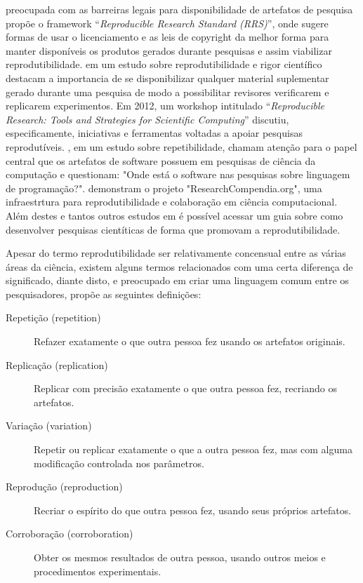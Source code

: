  preocupada com as barreiras legais para
disponibilidade de artefatos de pesquisa propõe o framework ``{\it Reproducible
Research Standard (RRS)}'', onde sugere formas de usar o licenciamento e as leis
de copyright da melhor forma para manter disponíveis os produtos gerados
durante pesquisas e assim viabilizar reprodutibilidade. 
em um estudo sobre reprodutibilidade e rigor científico destacam a importancia
de se disponibilizar qualquer material suplementar gerado durante uma pesquisa
de modo a possibilitar revisores verificarem e replicarem experimentos. Em
2012, um workshop intitulado ``{\it Reproducible Research: Tools and Strategies for
Scientific Computing}'' \cite{Stodden2012} discutiu, especificamente, iniciativas
e ferramentas voltadas a apoiar pesquisas reprodutíveis.
, em um estudo sobre repetibilidade, chamam
atenção para o papel central que os artefatos de software possuem em pesquisas
de ciência da computação e questionam: "Onde está o software nas pesquisas
sobre linguagem de programação?".  demonstram o
projeto "ResearchCompendia.org", uma infraestrtura para reprodutibilidade e
colaboração em ciência computacional. Além destes e tantos outros estudos em
\cite{GithubReproducibilityGuide} é possível acessar um guia sobre como
desenvolver pesquisas cientíticas de forma que promovam a reprodutibilidade.

Apesar do termo reprodutibilidade ser relativamente concensual entre as várias
áreas da ciência, existem alguns termos relacionados com uma certa diferença
de significado, diante disto, e preocupado em criar uma linguagem comum entre
os pesquisadores,  propõe as seguintes definições:

\begin{description}

  \item[Repetição (repetition)]
  Refazer exatamente o que outra pessoa fez usando os artefatos originais.

  \item[Replicação (replication)]
  Replicar com precisão exatamente o que outra pessoa fez, recriando os
  artefatos.

  \item[Variação (variation)]
  Repetir ou replicar exatamente o que a outra pessoa fez, mas com alguma
  modificação controlada nos parâmetros.

  \item[Reprodução (reproduction)]
  Recriar o espírito do que outra pessoa fez, usando seus próprios artefatos.

  \item[Corroboração (corroboration)]
  Obter os mesmos resultados de outra pessoa, usando outros meios e
  procedimentos experimentais.

\end{description}

